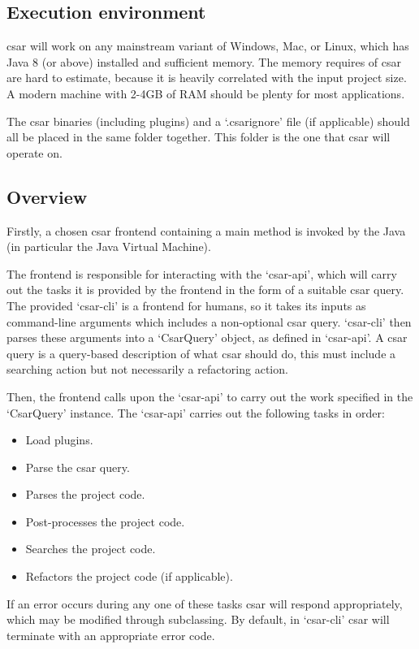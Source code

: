 \documentclass[12pt, letterpaper]{article}
\begin{document}
\subsection{Execution environment}
csar will work on any mainstream variant of Windows, Mac, or Linux, which has Java 8 (or above) installed and sufficient memory.
The memory requires of csar are hard to estimate, because it is heavily correlated with the input project size.
A modern machine with 2-4GB of RAM should be plenty for most applications.

The csar binaries (including plugins) and a `.csarignore' file (if applicable) should all be placed in the same folder together.
This folder is the one that csar will operate on.

\subsection{Overview}
Firstly, a chosen csar frontend containing a main method is invoked by the Java (in particular the Java Virtual Machine).

The frontend is responsible for interacting with the `csar-api', which will carry out the tasks it is provided by the frontend in the form of a suitable csar query.
The provided `csar-cli' is a frontend for humans, so it takes its inputs as command-line arguments which includes a non-optional csar query.
`csar-cli' then parses these arguments into a `CsarQuery' object, as defined in `csar-api'.
A csar query is a query-based description of what csar should do, this must include a searching action but not necessarily a refactoring action.

Then, the frontend calls upon the `csar-api' to carry out the work specified in the `CsarQuery' instance.
The `csar-api' carries out the following tasks in order:
\begin{itemize}
  \item Load plugins.
  \item Parse the csar query.
  \item Parses the project code.
  \item Post-processes the project code.
  \item Searches the project code.
  \item Refactors the project code (if applicable).
\end{itemize}
If an error occurs during any one of these tasks csar will respond appropriately, which may be modified through subclassing.
By default, in `csar-cli' csar will terminate with an appropriate error code.
\end{document}

